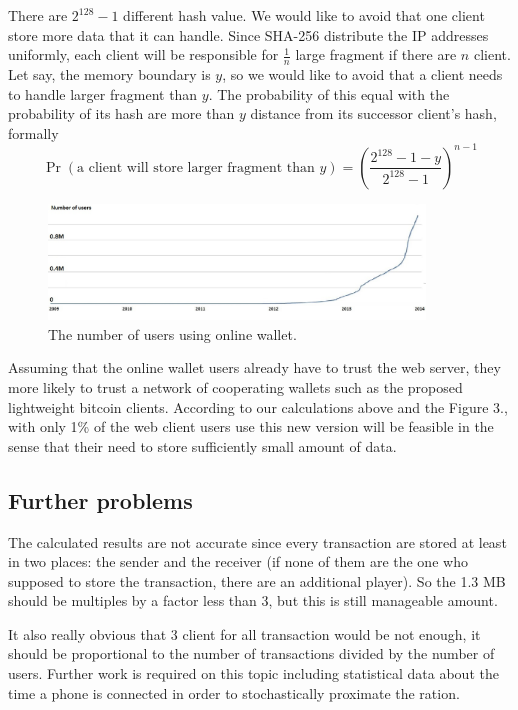 \documentclass[a4paper,12pt]{article}
\begin{document}
There are $2^{128}-1$ different hash value. We would like to avoid that one client store more data that it can handle. Since SHA-256 distribute the IP addresses uniformly, each client will be responsible for $\frac1n$ large fragment if there are $n$ client. Let say, the memory boundary is $y$, so we would like to avoid that a client needs to handle larger fragment than $y$. The probability of this equal with the probability of its hash are more than $y$ distance from its successor client's hash, formally
$$\Pr(\text{a client will store larger fragment than $y$})=\left(\frac{2^{128}-1-y}{2^{128}-1}\right)^{n-1}$$
\begin{figure}[h]\label{usr}
\begin{center}
\includegraphics[width=10cm]{felhasznalok.jpg}
\caption{The number of users using online wallet.}
\end{center}
\end{figure}
\vspace{-0.5cm}

Assuming that the online wallet users already have to trust the web server, they more likely to trust a network of cooperating wallets such as the proposed lightweight bitcoin clients. According to our calculations above and the Figure 3., with only 1\% of the web client users use this new version will be feasible in the sense that their need to store sufficiently small amount of data. 

\subsection{Further problems}
The calculated results are not accurate since every transaction are stored at least in two places: the sender and the receiver (if none of them are the one who supposed to store the transaction, there are an additional player). So the 1.3 MB should be multiples by a factor less than 3, but this is still manageable amount. 

\newpage

It also really obvious that 3 client for all transaction would be not enough, it should be proportional to the number of transactions divided by the number of users. Further work is required on this topic including statistical data about the time a phone is connected in order to stochastically proximate the ration. 
\end{document}
